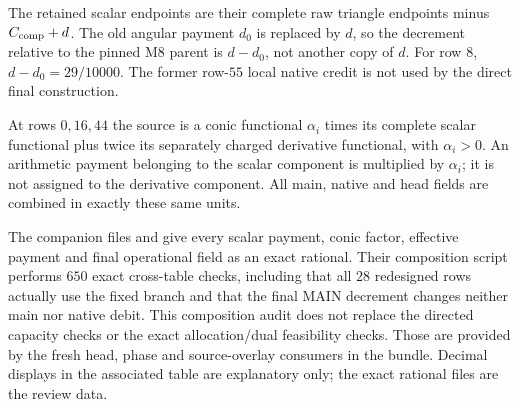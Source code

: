 \documentclass[11pt,a4paper]{article}
\theoremstyle{definition}
\theoremstyle{remark}
\begin{document}
The retained scalar endpoints are their complete raw triangle endpoints
minus $C_{\rm comp}+d$. The old angular payment $d_0$ is replaced by
$d$, so the decrement relative to the pinned M8 parent is $d-d_0$,
not another copy of $d$. For row $8$, $d-d_0=29/10000$.
The former row-$55$ local native credit is not used by the direct final
construction.

At rows $0,16,44$ the source is a conic functional
$\alpha_i$ times its complete scalar functional plus twice its separately
charged derivative functional, with $\alpha_i>0$. An arithmetic payment
belonging to the scalar component is multiplied by $\alpha_i$; it is
not assigned to the derivative component. All main, native and head
fields are combined in exactly these same units.

The companion files 
and  give every scalar
payment, conic factor, effective payment and final operational field as
an exact rational. Their composition script performs $650$ exact
cross-table checks, including that all $28$ redesigned rows actually use
the fixed branch and that the final MAIN decrement changes neither main
nor native debit. This composition audit does not replace the directed
capacity checks or the exact allocation/dual feasibility checks. Those
are provided by the fresh head, phase and source-overlay consumers in
the bundle. Decimal displays in the associated table are explanatory
only; the exact rational files are the review data.
\end{document}
